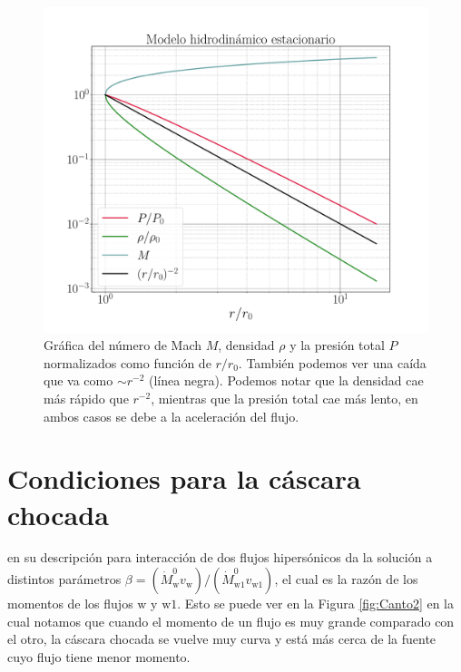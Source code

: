 \documentclass{book}
\begin{document}
\begin{figure}[htb]
    \centering    \includegraphics[width=\textwidth]{Nuevas imagenes finales/C2_estructura.pdf}
    \caption{Gráfica del número de Mach $M$, densidad $\rho$ y la presión
      total $P$ normalizados como función de $r/r_0$. También podemos
      ver una caída que va como $\sim r^{-2}$ (línea negra). Podemos
      notar que la densidad cae más rápido que $r^{-2}$, mientras que
      la presión total cae más lento, en ambos casos se debe a la
      aceleración del flujo. }
    \label{fig:grafica_C2}
\end{figure}

\section{Condiciones para la cáscara chocada}

\cite{Canto:1996} en su descripción para interacción de dos flujos
hipersónicos da la solución a distintos parámetros
$\beta=(\dot{M}^0_\mathrm{w}
v_\mathrm{w})/(\dot{M}^0_\mathrm{w1}v_\mathrm{w1})$, el cual es la
razón de los momentos de los flujos $\mathrm{w}$ y $\mathrm{w1}$. Esto
se puede ver en la Figura \ref{fig:Canto2} en la cual notamos que
cuando el momento de un flujo es muy grande comparado con el otro, la
cáscara chocada se vuelve muy curva y está más cerca de la fuente cuyo
flujo tiene menor momento.
\end{document}
